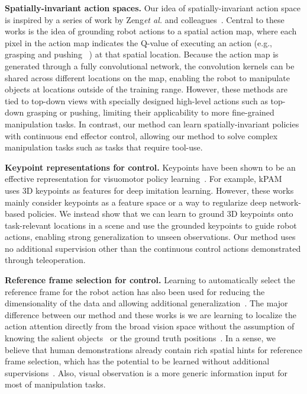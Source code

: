 \documentclass[letterpaper, 10 pt, conference]{ieeeconf}
\newcommand{\etal}{\xspace\emph{et al.}\xspace}
\begin{document}
\textbf{Spatially-invariant action spaces.}
Our idea of spatially-invariant action space is inspired by a series of work by Zeng\etal and colleagues~\cite{zeng2018robotic,zeng2018learning,zeng2020tossingbot,zakka2020form2fit,song2020grasping,wu2020spatial}. Central to these works is the idea of grounding robot actions to a spatial action map, where each pixel in the action map indicates the Q-value of executing an action (e.g., grasping and pushing ~\cite{zeng2018learning}) at that spatial location. Because the action map is generated through a fully convolutional network, the convolution kernels can be shared across different locations on the map, enabling the robot to manipulate objects at locations outside of the training range. However, these methods are tied to top-down views with specially designed high-level actions such as top-down grasping or pushing, limiting their applicability to more fine-grained manipulation tasks. In contrast, our method can learn spatially-invariant policies with continuous end effector control, allowing our method to solve complex manipulation tasks such as tasks that require tool-use.

\textbf{Keypoint representations for control.}
Keypoints have been shown to be an effective representation for visuomotor policy learning~\cite{kulkarni2019unsupervised,florencemanuelli2018dense,manuelli2019kpam,manuelli2020keypoints,qin2020keto}. For example, kPAM~\cite{manuelli2019kpam} uses 3D keypoints as features for deep imitation learning. 
However, these works mainly consider keypoints as a feature space or a way to regularize deep network-based policies. We instead show that we can learn to ground 3D keypoints onto task-relevant locations in a scene and use the grounded keypoints to guide robot actions, enabling strong generalization to unseen observations. Our method uses no additional supervision other than the continuous control actions demonstrated through teleoperation.

\textbf{Reference frame selection for control.}
Learning to automatically select the reference frame for the robot action has also been used for reducing the dimensionality of the data and allowing additional generalization~\cite{muhlig2009automatic, sharma2020learning, franzeselearning}. The major difference between our method and these works is we are learning to localize the action attention directly from the broad vision space without the assumption of knowing the salient objects~\cite{muhlig2009automatic} or the ground truth positions~\cite{sharma2020learning}. In a sense, we believe that human demonstrations already contain rich spatial hints for reference frame selection, which has the potential to be learned without additional supervisions~\cite{franzeselearning}. Also, visual observation is a more generic information input for most of manipulation tasks.
\end{document}
